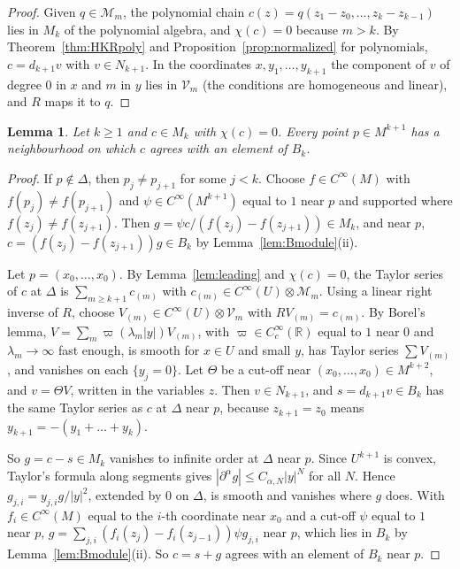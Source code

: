 \documentclass[11pt,oneside,reqno]{article}
\newcommand{\R}{\mathbb R}
\newcommand{\CI}{C^\infty}
\newcommand{\pa}{\partial}
\theoremstyle{plain}
\newtheorem{lemma}[theorem]{Lemma}
\theoremstyle{definition}
\theoremstyle{remark}
\begin{document}
\begin{proof}
Given \(q\in\mathcal M_m\), the polynomial chain \(c(z)=q(z_1-z_0,\dots,z_k-z_{k-1})\) lies in \(M_k\) of the
polynomial algebra, and \(\chi(c)=0\) because \(m>k\). By Theorem~\ref{thm:HKRpoly} and
Proposition~\ref{prop:normalized} for polynomials, \(c=d_{k+1}v\) with \(v\in N_{k+1}\). In the
coordinates \(x,y_1,\dots,y_{k+1}\) the component of \(v\) of degree \(0\) in \(x\) and \(m\) in \(y\) lies in
\(\mathcal V_m\) (the conditions are homogeneous and linear), and \(R\) maps it to \(q\).
\end{proof}

\begin{lemma}\label{lem:local}
Let \(k\ge1\) and \(c\in M_k\) with \(\chi(c)=0\). Every point \(p\in M^{k+1}\) has a neighbourhood on which
\(c\) agrees with an element of \(B_k\).
\end{lemma}

\begin{proof}
If \(p\notin\Delta\), then \(p_j\ne p_{j+1}\) for some \(j<k\). Choose \(f\in\CI(M)\) with \(f(p_j)\ne f(p_{j+1})\) and
\(\psi\in\CI(M^{k+1})\) equal to \(1\) near \(p\) and supported where \(f(z_j)\ne f(z_{j+1})\). Then
\(g=\psi c/(f(z_j)-f(z_{j+1}))\in M_k\), and near \(p\), \(c=(f(z_j)-f(z_{j+1}))g\in B_k\) by
Lemma~\ref{lem:Bmodule}(ii).

Let \(p=(x_0,\dots,x_0)\). By Lemma~\ref{lem:leading} and \(\chi(c)=0\), the Taylor series of \(c\) at
\(\Delta\) is \(\sum_{m\ge k+1}c_{(m)}\) with \(c_{(m)}\in\CI(U)\otimes\mathcal M_m\). Using a linear right inverse of \(R\),
choose \(V_{(m)}\in\CI(U)\otimes\mathcal V_m\) with \(RV_{(m)}=c_{(m)}\). By Borel's lemma,
\(V=\sum_m\varpi(\lambda_m|y|)V_{(m)}\), with \(\varpi\in\CI_c(\R)\) equal to \(1\) near \(0\) and \(\lambda_m\to\infty\) fast
enough, is smooth for \(x\in U\) and small \(y\), has Taylor series \(\sum V_{(m)}\), and vanishes on
each \(\{y_j=0\}\). Let \(\Theta\) be a cut-off near \((x_0,\dots,x_0)\in M^{k+2}\), and \(v=\Theta V\), written in the
variables \(z\). Then \(v\in N_{k+1}\), and \(s=d_{k+1}v\in B_k\) has the same Taylor series as \(c\) at \(\Delta\)
near \(p\), because \(z_{k+1}=z_0\) means \(y_{k+1}=-(y_1+\dots+y_k)\).

So \(g=c-s\in M_k\) vanishes to infinite order at \(\Delta\) near \(p\). Since \(U^{k+1}\) is convex,
Taylor's formula along segments gives \(|\pa^\alpha g|\le C_{\alpha,N}|y|^N\) for all \(N\). Hence
\(g_{j,i}=y_{j,i}g/|y|^2\), extended by \(0\) on \(\Delta\), is smooth and vanishes where \(g\) does. With
\(f_i\in\CI(M)\) equal to the \(i\)-th coordinate near \(x_0\) and a cut-off \(\psi\) equal to \(1\) near \(p\),
\(g=\sum_{j,i}(f_i(z_j)-f_i(z_{j-1}))\psi g_{j,i}\) near \(p\), which lies in \(B_k\) by
Lemma~\ref{lem:Bmodule}(ii). So \(c=s+g\) agrees with an element of \(B_k\) near \(p\).
\end{proof}
\end{document}
